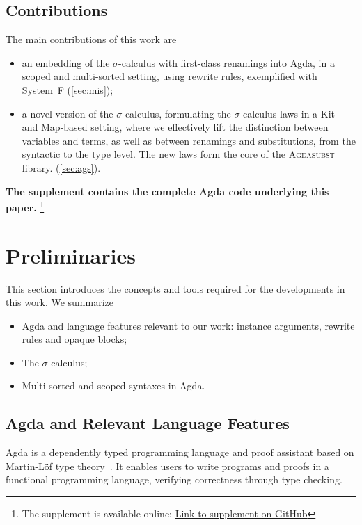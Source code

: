 \documentclass[screen,nonacm]{acmart}
\begin{document}
\subsection*{Contributions}
The main contributions of this work are
\begin{itemize}
      \item an embedding of the $σ$-calculus with first-class renamings into Agda, in a
            scoped and multi-sorted setting, using rewrite rules, exemplified with System~F
            (\cref{sec:mis});
      \item a novel version of the $σ$-calculus, formulating the $σ$-calculus laws in a
            Kit- and Map-based setting, where we effectively lift the distinction between
            variables and terms, as well as between renamings and substitutions, from the
            syntactic to the type level. The new laws form the core of the
            \textsc{Agdasubst} library. (\cref{sec:ags}).
\end{itemize}

\noindent\textbf{The supplement contains the complete Agda code underlying this paper.}
\footnote{The supplement is available online:
      \href{https://github.com/Mari-W/Agdasubst}{Link to supplement on GitHub}}

\section{Preliminaries}\label{sec:pre}
This section introduces the concepts and tools required for the developments in
this work. We summarize
\begin{itemize}
      \item Agda and language features relevant to our work: instance arguments, rewrite
            rules and opaque blocks;
      \item The $σ$-calculus;
      \item Multi-sorted and scoped syntaxes in Agda.
\end{itemize}

\subsection{Agda and Relevant Language Features}\label{sec:pre-agd}
Agda is a dependently typed programming language and proof assistant based on
Martin-Löf type theory~\cite{MARTINLOF197573}. It enables users to write
programs and proofs in a functional programming language, verifying correctness
through type checking.
\end{document}
